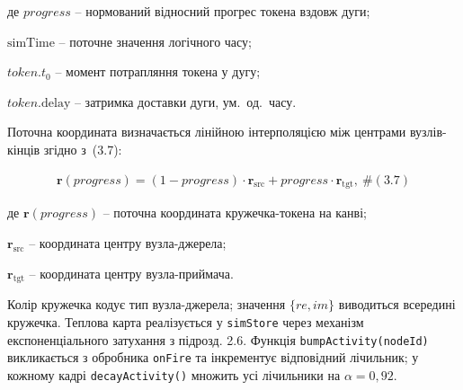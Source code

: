 \documentclass[
]{article}
\newcommand{\passthrough}[1]{#1}
\begin{document}
де \(progress\) -- нормований відносний прогрес токена вздовж дуги;

\(\text{simTime}\) -- поточне значення логічного часу;

\(token.t_{0}\) -- момент потрапляння токена у дугу;

\(token.\text{delay}\) -- затримка доставки дуги, ум.~од.~часу.

Поточна координата визначається лінійною інтерполяцією між центрами
вузлів-кінців згідно з~(3.7):

\[\begin{array}{r}
\mathbf{r}(progress) = (1 - progress) \cdot \mathbf{r}_{\text{src}} + progress \cdot \mathbf{r}_{\text{tgt}},\ \mathbf{\#}(3.7)
\end{array}\]

де \(\mathbf{r}(progress)\) -- поточна координата кружечка-токена на
канві;

\(\mathbf{r}_{\text{src}}\) -- координата центру вузла-джерела;

\(\mathbf{r}_{\text{tgt}}\) -- координата центру вузла-приймача.

Колір кружечка кодує тип вузла-джерела; значення \(\{ re,im\}\)
виводиться всередині кружечка. Теплова карта реалізується у
\passthrough{\lstinline!simStore!} через механізм експоненціального
затухання з підрозд. 2.6. Функція
\passthrough{\lstinline!bumpActivity!}\passthrough{\lstinline!(!}\passthrough{\lstinline!nodeId!}\passthrough{\lstinline!)!}
викликається з обробника \passthrough{\lstinline!onFire!} та інкрементує
відповідний лічильник; у кожному кадрі
\passthrough{\lstinline!decayActivity!}\passthrough{\lstinline!()!}
множить усі лічильники на \(\alpha = 0,92\).
\end{document}
